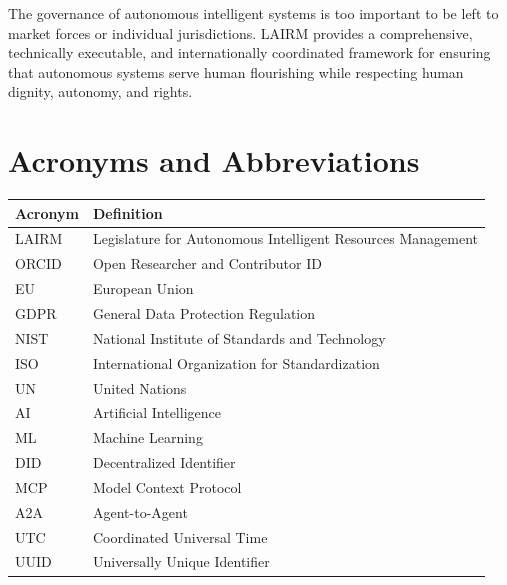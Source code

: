 \documentclass[12pt,a4paper,twoside,openright]{book}
\begin{document}
The governance of autonomous intelligent systems is too important to be left to market forces or individual jurisdictions. LAIRM provides a comprehensive, technically executable, and internationally coordinated framework for ensuring that autonomous systems serve human flourishing while respecting human dignity, autonomy, and rights.

\backmatter




\chapter*{Acronyms and Abbreviations}

\begin{tabularx}{\textwidth}{@{}lX@{}}
\toprule
\textbf{Acronym} & \textbf{Definition} \\
\midrule
LAIRM & Legislature for Autonomous Intelligent Resources Management \\
ORCID & Open Researcher and Contributor ID \\
EU & European Union \\
GDPR & General Data Protection Regulation \\
NIST & National Institute of Standards and Technology \\
ISO & International Organization for Standardization \\
UN & United Nations \\
AI & Artificial Intelligence \\
ML & Machine Learning \\
DID & Decentralized Identifier \\
MCP & Model Context Protocol \\
A2A & Agent-to-Agent \\
UTC & Coordinated Universal Time \\
UUID & Universally Unique Identifier \\
\bottomrule
\end{tabularx}

\cleardoublepage

\end{document}
